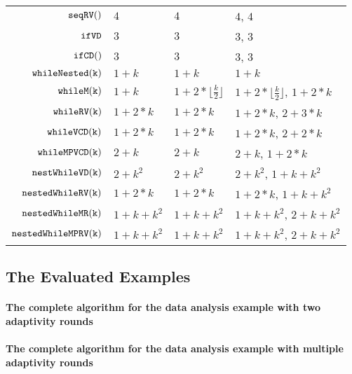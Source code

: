 \begin {table}[H]
\begin{center}
{\begin{tabular}{ r | p{12mm} | p{60mm} | p{30mm}}
         $\mathtt{seqRV()}$ & $4$ & $4$ & $4$, $4$ \\  
         $ \mathtt{ifVD}$ & $3$ & $3$ & $3$, $3$ \\
         $\mathtt{ifCD()}$ & $3$ & $3$ & $3$, $3$  \\
         $ \mathtt{whileNested(k)}$ & $1+k$ & $1+k$ & $1+k$  \\
         $ \mathtt{whileM(k)}$ & $1 + k$ & $1 +2 * \lfloor \frac{k}{2} \rfloor$ & $1 +2 * \lfloor \frac{k}{2} \rfloor$, $1 + 2 * k$  \\
         $ \mathtt{whileRV(k)}$ & $1 + 2*k$ & $1 + 2*k$ & $1 + 2*k$, $2 + 3 * k$  \\
         $ \mathtt{whileVCD(k)}$ & $1 + 2*k$ & $1 + 2*k$ & $1 + 2 * k$, $2 + 2 * k$  \\
         $ \mathtt{whileMPVCD(k)}$ & $2 + k$ & $2 + k$  & $2 + k$, $1 + 2 * k$   \\
         $ \mathtt{nestWhileVD(k)}$ & $2 + k^2$ & $2 + k^2$  & $2 + k^2$, $1 + k + k^2$   \\
         $ \mathtt{nestedWhileRV(k)}$ & $1 + 2*k$ & $1 + 2*k$ & $1 + 2*k$,  $1 + k + k^2$   \\
         $ \mathtt{nestedWhileMR(k)}$ & $1 + k + k^2$ & $1 + k + k^2$  & $1 + k + k^2$,  $2 + k + k^2$  \\
         $ \mathtt{nestedWhileMPRV(k)}$ & $1 + k + k^2$ & $1 + k + k^2$  & $1 + k + k^2$,  $2 + k + k^2$  \\
        \end{tabular}
}        
\end{center}
\end{table}
 \subsection{The Evaluated Examples}  
 \paragraph{The complete algorithm for the data analysis example with two adaptivity rounds} 
 

 \paragraph{The complete algorithm for the data analysis example with multiple adaptivity rounds} 
 
